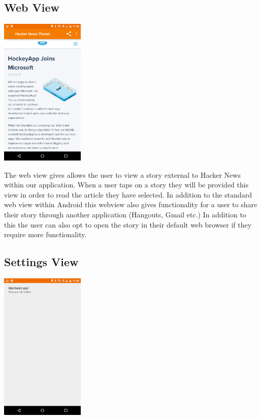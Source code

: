 \documentclass[11pt]{article}
\begin{document}
\subsection*{Web View}

\begin{center}
\includegraphics[width=0.3\textwidth]{webView.png}
\end{center}

The web view gives allows the user to view a story external to Hacker News within our application. When a user taps on a story they will be provided this view in order to read the article they have selected. In addition to the standard web view within Android this webview also gives functionality for a user to share their story through another application (Hangouts, Gmail etc.) In addition to this the user can also opt to open the story in their default web browser if they require more functionality.

\subsection*{Settings View}

\begin{center}
\includegraphics[width=0.3\textwidth]{settings.png}
\end{center}
\end{document}
